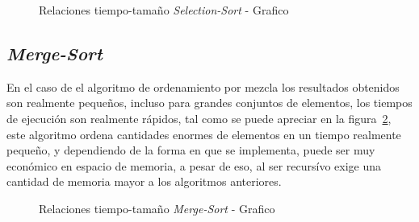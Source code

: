 \documentclass[twocolumn,english,journal]{IEEEtran}
\begin{document}
\begin{figure}[h]
\caption{Relaciones tiempo-tamaño \emph{Selection-Sort} - Grafico \label{Plot-Selection}}
\end{figure}

\subsection{\emph{Merge-Sort}}
En el caso de el algoritmo de ordenamiento por mezcla los resultados obtenidos son realmente pequeños, incluso para grandes conjuntos de elementos, los tiempos de ejecución son realmente rápidos, tal como se puede apreciar en la figura~\ref{Plot-Merge}, este algoritmo ordena cantidades enormes de elementos en un tiempo realmente pequeño, y dependiendo de la forma en que se implementa, puede ser muy económico en espacio de memoria, a pesar de eso, al ser recursívo exige una cantidad de memoria mayor a los algoritmos anteriores. 

\begin{figure}[h]
\caption{Relaciones tiempo-tamaño \emph{Merge-Sort} - Grafico \label{Plot-Merge}}
\end{figure}
\end{document}
